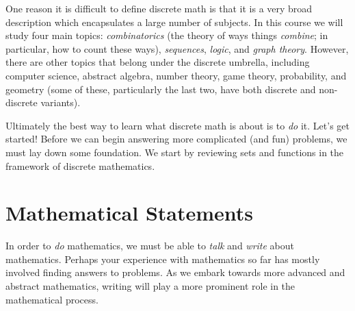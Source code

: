\documentclass[10pt,]{book}
\theoremstyle{plain}
\theoremstyle{definition}
\theoremstyle{definition}
\theoremstyle{definition}
\numberwithin{equation}{section}
\begin{document}
    One reason it is difficult to define discrete math is that it is a very broad description which encapsulates a large number of subjects. In this course we will study four main topics: \emph{combinatorics} (the theory of ways things \emph{combine};
    in particular, how to count these ways), \emph{sequences}, \emph{logic}, and \emph{graph theory}. However, there are other topics that belong under the discrete umbrella, including computer science, abstract algebra, number theory, game theory,
    probability, and geometry (some of these, particularly the last two, have both discrete and non-discrete variants).
\par

    Ultimately the best way to learn what discrete math is about is to \emph{do} it. Let's get started! Before we can begin answering more complicated (and fun) problems, we must lay down some foundation. We start by reviewing sets and functions in
    the framework of discrete mathematics.
\typeout{************************************************}
\typeout{************************************************}
\section[
    Mathematical Statements
  ]{
    Mathematical Statements
  }\label{sec_intro-statements}
\typeout{************************************************}
\typeout{************************************************}

      In order to \emph{do} mathematics, we must be able to
      \emph{talk} and \emph{write} about mathematics. Perhaps your experience with mathematics so far has mostly involved finding answers to problems. As we embark towards more advanced and abstract mathematics, writing will play a more prominent role in the mathematical process.
\par
\end{document}
